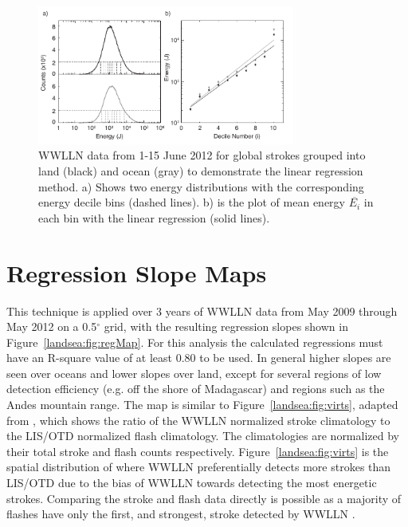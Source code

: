 \begin{figure}[ht!]
   \centering
   \noindent\includegraphics[width=20pc]{LandSea/Figures/1_linearRegression.pdf} 
   \caption{WWLLN data from 1-15 June 2012 for global strokes grouped into land (black) and ocean (gray) to demonstrate the linear regression method. a) Shows two energy distributions with the corresponding energy decile bins (dashed lines). b) is the plot of mean energy $\overline{E_i}$ in each bin with the linear regression (solid lines).}
   \label{landsea:fig:linRegTheory}
\end{figure}

\section{Regression Slope Maps}

This technique is applied over 3 years of WWLLN data from May 2009 through May 2012 on a 0.5$^\circ$ grid, with the resulting regression slopes shown in Figure~\ref{landsea:fig:regMap}.
For this analysis the calculated regressions must have an R-square value of at least 0.80 to be used.
In general higher slopes are seen over oceans and lower slopes over land, except for several regions of low detection efficiency (e.g. off the shore of Madagascar) and regions such as the Andes mountain range.
The map is similar to Figure~\ref{landsea:fig:virts}, adapted from \citet{Virts2013}, which shows the ratio of the WWLLN normalized stroke climatology to the LIS/OTD normalized flash climatology.
The climatologies are normalized by their total stroke and flash counts respectively.
Figure~\ref{landsea:fig:virts} is the spatial distribution of where WWLLN preferentially detects more strokes than LIS/OTD due to the bias of WWLLN towards detecting the most energetic strokes.
Comparing the stroke and flash data directly is possible as a majority of flashes have only the first, and strongest, stroke detected by WWLLN \citep{Abarca2010}.


